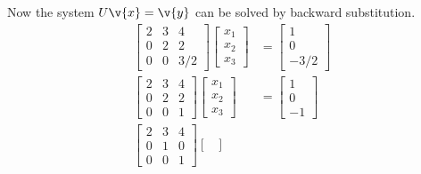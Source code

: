 \documentclass[11pt]{article}
\begin{document}
\begin{enumerate}
\begin{enumerate}
                Now the system $U\v{x} = \v{y}$ can be solved by backward
                substitution.
                \begin{align*}
                    \begin{bmatrix}
                        2 & 3 & 4 \\
                        0 & 2 & 2 \\
                        0 & 0 & 3/2
                    \end{bmatrix}
                    \begin{bmatrix}
                        x_1 \\
                        x_2 \\
                        x_3
                    \end{bmatrix}
                    &= 
                    \begin{bmatrix}
                        1 \\
                        0 \\
                        -3/2
                    \end{bmatrix} \\
                    \begin{bmatrix}
                        2 & 3 & 4 \\
                        0 & 2 & 2 \\
                        0 & 0 & 1
                    \end{bmatrix}
                    \begin{bmatrix}
                        x_1 \\
                        x_2 \\
                        x_3
                    \end{bmatrix}
                    &= 
                    \begin{bmatrix}
                        1 \\
                        0 \\
                        -1
                    \end{bmatrix} \\
                    \begin{bmatrix}
                        2 & 3 & 4 \\
                        0 & 1 & 0 \\
                        0 & 0 & 1
                    \end{bmatrix}
                    \begin{bmatrix}

\end{bmatrix}
\end{align*}
\end{enumerate}
\end{enumerate}
\end{document}
